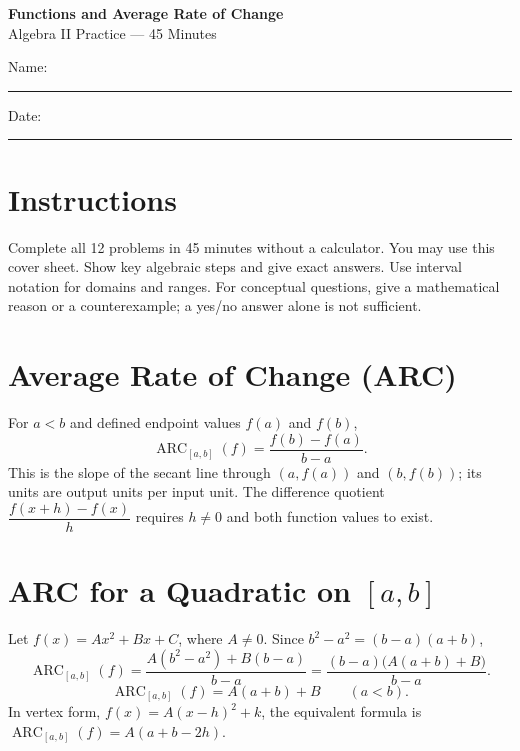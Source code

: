 \documentclass[11pt]{article}
\begin{document}
\begin{center}
  {\Large\textbf{Functions and Average Rate of Change}}\\[3pt]
  {\large Algebra II Practice --- 45 Minutes}
\end{center}

Name: \rule{2.7in}{0.4pt}\hfill Date: \rule{1.5in}{0.4pt}

\section*{Instructions}
Complete all 12 problems in 45 minutes without a calculator. You may use this
cover sheet. Show key algebraic steps and give exact answers. Use interval
notation for domains and ranges. For conceptual questions, give a mathematical
reason or a counterexample; a yes/no answer alone is not sufficient.

\section*{Average Rate of Change (ARC)}
For $a<b$ and defined endpoint values $f(a)$ and $f(b)$,
\[
  \boxed{\operatorname{ARC}_{[a,b]}(f)=\frac{f(b)-f(a)}{b-a}}.
\]
This is the slope of the secant line through $(a,f(a))$ and $(b,f(b))$;
its units are output units per input unit. The difference quotient
$\dfrac{f(x+h)-f(x)}{h}$ requires $h\ne0$ and both function values to exist.

\section*{ARC for a Quadratic on $[a,b]$}
Let $f(x)=Ax^2+Bx+C$, where $A\ne0$. Since $b^2-a^2=(b-a)(a+b)$,
\[
  \operatorname{ARC}_{[a,b]}(f)
  =\frac{A(b^2-a^2)+B(b-a)}{b-a}
  =\frac{(b-a)\bigl(A(a+b)+B\bigr)}{b-a}.
\]
\[
  \boxed{\operatorname{ARC}_{[a,b]}(f)=A(a+b)+B}
  \qquad(a<b).
\]
In vertex form, $f(x)=A(x-h)^2+k$, the equivalent formula is
$\operatorname{ARC}_{[a,b]}(f)=A(a+b-2h)$.
\end{document}
